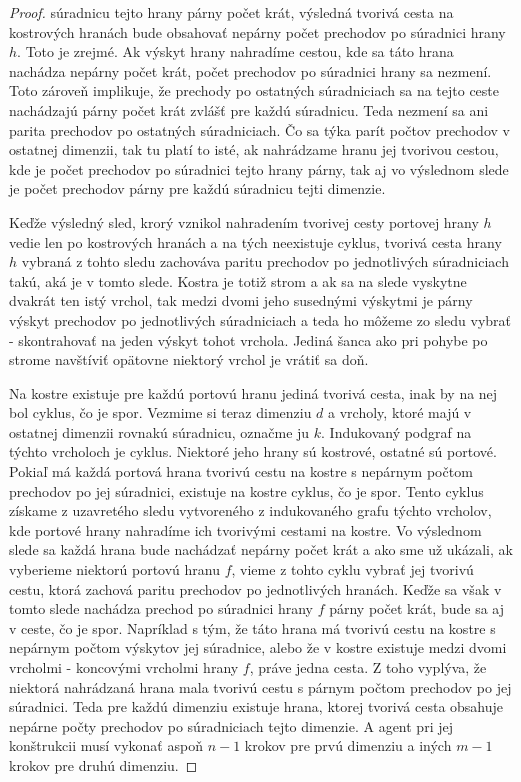 \begin{proof}
súradnicu tejto hrany párny počet krát, výsledná tvorivá cesta na
kostrových hranách bude obsahovať nepárny počet prechodov po súradnici 
hrany $h$.
Toto je zrejmé. Ak výskyt hrany nahradíme cestou, kde sa táto hrana nachádza
nepárny počet krát, počet prechodov po súradnici hrany sa nezmení. Toto
zároveň implikuje, že prechody po ostatných súradniciach sa na tejto ceste
nachádzajú párny počet krát zvlášť pre každú súradnicu. Teda nezmení sa ani
parita prechodov po ostatných súradniciach.
Čo sa týka parít počtov prechodov v ostatnej dimenzii, tak tu platí to isté,
ak nahrádzame hranu jej tvorivou cestou, kde je počet prechodov po súradnici
tejto hrany párny, tak aj vo výslednom slede je počet prechodov párny pre každú
súradnicu tejti dimenzie.

Keďže výsledný sled, krorý vznikol nahradením tvorivej cesty portovej hrany
$h$ vedie len po kostrových hranách a na tých neexistuje cyklus, tvorivá
cesta hrany $h$ vybraná z tohto sledu zachováva paritu prechodov po
jednotlivých súradniciach takú, aká je v tomto slede.
Kostra je totiž strom a ak sa na slede vyskytne dvakrát ten istý vrchol, tak
medzi dvomi jeho susednými výskytmi je párny výskyt prechodov po
jednotlivých súradniciach a teda ho môžeme zo sledu vybrať - skontrahovať na
jeden výskyt tohot vrchola. Jediná šanca ako pri pohybe po strome navštíviť
opätovne niektorý vrchol je vrátiť sa doň.

Na kostre existuje pre každú portovú hranu jediná tvorivá cesta, inak by na
nej bol cyklus, čo je spor.
Vezmime si teraz dimenziu $d$ a vrcholy, ktoré majú v ostatnej dimenzii
rovnakú súradnicu, označme ju $k$. Indukovaný podgraf na týchto vrcholoch je
cyklus. Niektoré jeho hrany sú kostrové, ostatné sú portové. Pokiaľ má každá
portová hrana tvorivú cestu na kostre s nepárnym počtom prechodov po jej
súradnici, existuje na kostre cyklus, čo je spor.
Tento cyklus získame z uzavretého sledu vytvoreného z indukovaného grafu
týchto vrcholov, kde portové hrany nahradíme ich tvorivými cestami na
kostre. Vo výslednom slede sa každá hrana bude nachádzať nepárny počet krát
a ako sme už ukázali, ak vyberieme niektorú portovú hranu $f$, vieme z tohto
cyklu vybrať jej tvorivú cestu, ktorá zachová paritu prechodov po
jednotlivých hranách. Keďže sa však v tomto slede nachádza prechod po
súradnici hrany $f$ párny počet krát, bude sa aj v ceste, čo je spor.
Napríklad s tým, že táto hrana má tvorivú cestu na kostre s nepárnym počtom
výskytov jej súradnice, alebo že v kostre existuje medzi dvomi vrcholmi -
koncovými vrcholmi hrany $f$, práve jedna cesta.
Z toho vyplýva, že niektorá nahrádzaná hrana mala tvorivú cestu s párnym
počtom prechodov po jej súradnici.
Teda pre každú dimenziu existuje hrana, ktorej tvorivá cesta obsahuje
nepárne počty prechodov po súradniciach tejto dimenzie. A agent pri jej
konštrukcii musí vykonať aspoň $n - 1$ krokov pre prvú dimenziu a iných $m -
1$ krokov pre druhú dimenziu.
\end{proof}



